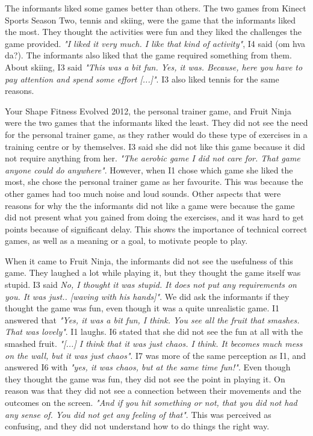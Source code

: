 The informants liked some games better than others. The two games from Kinect Sports Season Two, tennis and skiing, were the game that the informants liked the most. They thought the activities were fun and they liked the challenges the game provided. \emph{"I liked it very much. I like that kind of activity"}, I4 said (om hva da?). The informants also liked that the game required something from them. About skiing, I3 said \emph{"This was a bit fun. Yes, it was. Because, here you have to pay attention and spend some effort [...]"}. I3 also liked tennis for the same reasons.  

Your Shape Fitness Evolved 2012, the personal trainer game, and Fruit Ninja were the two games that the informants liked the least. They did not see the need for the personal trainer game, as they rather would do these type of exercises in a training centre or by themselves. I3 said she did not like this game because it did not require anything from her. \emph{"The aerobic game I did not care for. That game anyone could do anywhere"}. However, when I1 chose which game she liked the most, she chose the personal trainer game as her favourite. This was because the other games had too much noise and loud sounds. Other aspects that were reasons for why the the informants did not like a game were because the game did not present what you gained from doing the exercises, and it was hard to get points because of significant delay. This shows the importance of technical correct games, as well as a meaning or a goal, to motivate people to play. 

When it came to Fruit Ninja, the informants did not see the usefulness of this game. They laughed a lot while playing it, but they thought the game itself was stupid. I3 said \emph{No, I thought it was stupid. It does not put any requirements on you. It was just.. [waving with his hands]"}. We did ask the informants if they thought the game was fun, even though it was a quite unrealistic game. I1 answered that \emph{"Yes, it was a bit fun, I think. You see all the fruit that smashes. That was lovely"}. I1 laughs. I6 stated that she did not see the fun at all with the smashed fruit. \emph{"[...] I think that it was just chaos. I think. It becomes much mess on the wall, but it was just chaos"}. I7 was more of the same perception as I1, and answered I6 with \emph{"yes, it was chaos, but at the same time fun!"}. Even though they thought the game was fun, they did not see the point in playing it. On reason was that they did not see a connection between their movements and the outcomes on the screen. \emph{"And if you hit something or not, that you did not had any sense of. You did not get any feeling of that"}. This was perceived as confusing, and they did not understand how to do things the right way. 

